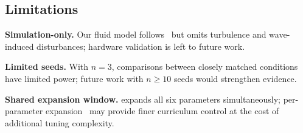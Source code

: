 \subsection{Limitations}

\textbf{Simulation-only.}
Our fluid model follows~\citet{fossen2011} but omits turbulence and
wave-induced disturbances; hardware validation is left to future work.

\textbf{Limited seeds.}
With $n{=}3$, comparisons between closely matched conditions have
limited power; future work with $n{\geq}10$ seeds would strengthen
evidence.

\textbf{Shared expansion window.}
\CDR{} expands all six parameters simultaneously; per-parameter
expansion~\cite{akkaya2019} may provide finer curriculum control at
the cost of additional tuning complexity.